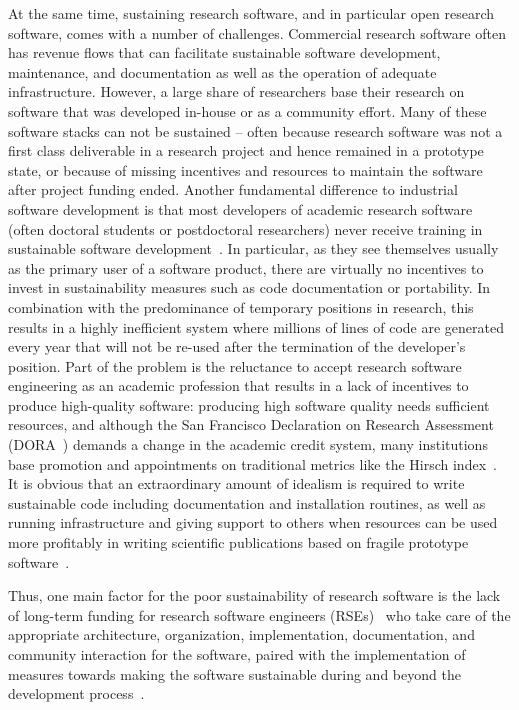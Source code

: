 \documentclass[a4paper,num-refs,numbers,sort&compress]{de-rse}
\begin{document}
At the same time, sustaining research software, and in particular open research software, comes with a number of challenges. Commercial research software often has revenue flows that can facilitate sustainable software development, maintenance, and documentation as well as the operation of adequate infrastructure. However, a large share of researchers base their research on software that was developed in-house or as a community effort. Many of these software stacks can not be sustained -- often because research software was not a first class deliverable in a research project and hence remained in a prototype state, or because of missing incentives and resources to maintain the software after project funding ended.
Another fundamental difference to industrial software development is that most developers of academic research software (often doctoral students or postdoctoral researchers) never receive training in sustainable software development~\cite{SSIanalysis}. In particular, as they see themselves usually as the primary user of a software product, there are virtually no incentives to invest in sustainability measures such as code documentation or portability.
In combination with the predominance of temporary positions in research, this results in a highly inefficient system where millions of lines of code are generated every year that will not be re-used after the termination of the developer's position.
Part of the problem is the reluctance to accept research software engineering as an academic profession that results in a lack of incentives to produce high-quality software: producing high software quality needs sufficient resources, and although the San Francisco Declaration on Research Assessment (DORA~\cite{DORA}) demands a change in the academic credit system, many institutions base promotion and appointments on traditional metrics like the Hirsch index~\cite{Hirsch2005}.
It is obvious that an extraordinary amount of idealism is required to write sustainable code including documentation and installation routines, as well as running infrastructure and giving support to others when resources can be used more profitably in writing scientific publications based on fragile prototype software~\cite{bangerth2014quo,Prins2015}.

Thus, one main factor for the poor sustainability of research software is the lack of long-term funding for research software engineers (RSEs)~\cite{RSEdef} who take care of the appropriate architecture, organization, implementation, documentation, and community interaction for the software, paired with the implementation of measures towards making the software sustainable during and beyond the development process~\cite{SSIRSE}.
\end{document}
